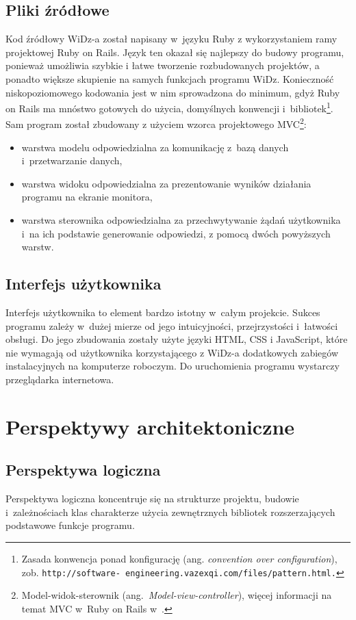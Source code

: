 \documentclass[12pt,leqno,twoside]{mwart}
\begin{document}
\subsection{Pliki źródłowe}
\noindent Kod źródłowy WiDz-a został napisany w~języku Ruby z wykorzystaniem ramy projektowej Ruby on Rails. Język ten okazał się najlepszy do budowy programu, ponieważ umożliwia szybkie i łatwe tworzenie rozbudowanych projektów, a ponadto większe skupienie na samych funkcjach programu WiDz. Konieczność niskopoziomowego kodowania jest w nim sprowadzona do minimum, gdyż Ruby on Rails ma mnóstwo gotowych do użycia, domyślnych konwencji i~bibliotek\footnote{Zasada konwencja ponad konfigurację (ang. \textit{convention over configuration}), zob. \tt{http://software}\rm{-} \tt{engineering.vazexqi.com/files/pattern.html}.}. Sam program został zbudowany z użyciem wzorca projektowego MVC\footnote{Model-widok-sterownik (ang.~\textit{Model-view-controller}), więcej informacji na temat MVC w~Ruby on Rails w~\cite{SP}.}:
\begin{itemize}
\item warstwa modelu odpowiedzialna za komunikację z~bazą danych i~przetwarzanie danych,
\item warstwa widoku odpowiedzialna za prezentowanie wyników działania programu na ekranie monitora,
\item warstwa sterownika odpowiedzialna za przechwytywanie żądań użytkownika i~na ich podstawie generowanie odpowiedzi, z pomocą dwóch powyższych warstw.
\end{itemize}

\subsection{Interfejs użytkownika}
\noindent Interfejs użytkownika to element bardzo istotny w~całym projekcie. Sukces programu zależy w~dużej mierze od jego intuicyjności, przejrzystości i~łatwości obsługi. Do jego zbudowania zostały użyte języki HTML, CSS i JavaScript, które nie wymagają od użytkownika korzystającego z WiDz-a dodatkowych zabiegów instalacyjnych na komputerze roboczym. Do uruchomienia programu wystarczy przeglądarka internetowa.

\section{Perspektywy architektoniczne}
\subsection{Perspektywa logiczna}
\noindent Perspektywa logiczna koncentruje się na strukturze projektu, budowie i~zależnościach klas charakterze użycia zewnętrznych bibliotek rozszerzających podstawowe funkcje programu.%
\end{document}

